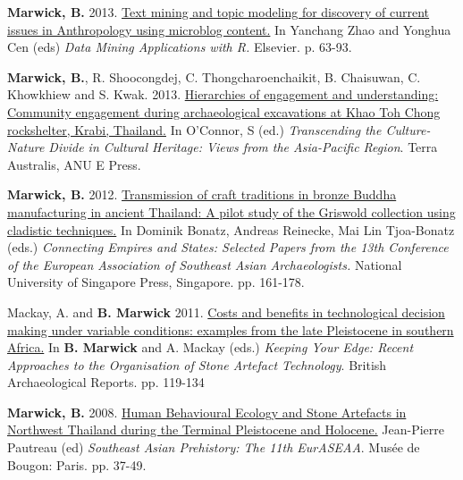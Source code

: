 \documentclass[11pt,article,oneside]{memoir}
\begin{document}
{{{{\ind \textbf{Marwick, B.} 2013. \href{http://faculty.washington.edu/bmarwick/PDFs/Marwick_2013_DMAR.pdf}{Text mining and topic modeling for discovery of current issues in Anthropology using microblog content.} In  Yanchang Zhao and Yonghua Cen (eds) \textit{Data Mining Applications with R.} Elsevier. p. 63-93.

\ind \textbf{Marwick, B.}, R. Shoocongdej, C. Thongcharoenchaikit, B. Chaisuwan, C. Khowkhiew and S. Kwak.  2013. \href{http://faculty.washington.edu/bmarwick/PDFs/Marwick_et_al_2013_community.pdf}{Hierarchies of engagement and understanding: Community engagement during archaeological excavations at Khao Toh Chong rockshelter, Krabi, Thailand.} In O’Connor, S (ed.) \textit{Transcending the Culture-Nature Divide in Cultural Heritage: Views from the Asia-Pacific Region}. Terra Australis, ANU E Press.

\ind \textbf{Marwick, B.} 2012. \href{http://faculty.washington.edu/bmarwick/PDFs/Marwick_2012_Buddha_cladistics.pdf}{Transmission of craft traditions in bronze Buddha manufacturing in ancient Thailand: A pilot study of the Griswold collection using cladistic techniques.} In Dominik Bonatz, Andreas Reinecke, Mai Lin Tjoa-Bonatz (eds.)\textit{ Connecting Empires and States: Selected Papers from the 13th Conference of the European Association of Southeast Asian Archaeologists.} National University of Singapore Press, Singapore. pp. 161-178.

\ind Mackay, A. and \textbf{B. Marwick} 2011. \href{http://faculty.washington.edu/bmarwick/PDFs/Mackay_and_Marwick_2011_timecost.pdf}{Costs and benefits in technological decision making under variable conditions: examples from the late Pleistocene in southern Africa.} In \textbf{B. Marwick} and A. Mackay (eds.) \textit{Keeping Your Edge: Recent Approaches to the Organisation of Stone Artefact Technology}. British Archaeological Reports.  pp. 119-134

\ind \textbf{Marwick, B.} 2008. \href{http://faculty.washington.edu/bmarwick/PDFs/Marwick_2008_EurASEAA.pdf}{Human Behavioural Ecology and Stone Artefacts in Northwest Thailand during the Terminal Pleistocene and Holocene.} Jean-Pierre Pautreau (ed) \textit{Southeast Asian Prehistory: The 11th EurASEAA}. Musée de Bougon: Paris. pp. 37-49.

\bigskip


}}}}
\end{document}
